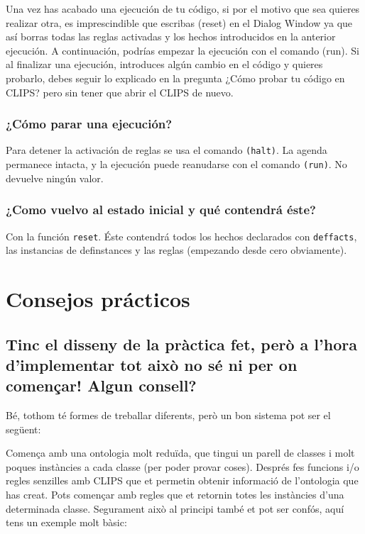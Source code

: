 \documentclass[11pt,svgnames]{scrbook}
\begin{document}
Una vez has acabado una ejecución de tu código, si por el motivo que sea quieres
realizar otra, es imprescindible que escribas (reset) en el Dialog Window ya que
así borras todas las reglas activadas y los hechos introducidos en la anterior
ejecución. A continuación, podrías empezar la ejecución con el comando (run).
Si al finalizar una ejecución, introduces algún cambio en el código y quieres
probarlo, debes seguir lo explicado en la pregunta ¿Cómo probar tu código en
CLIPS? pero sin tener que abrir el CLIPS de nuevo.

\subsection{¿Cómo parar una ejecución?}

Para detener la activación de reglas se usa el comando \texttt{(halt)}. La agenda permanece intacta, y la ejecución puede reanudarse con el comando \texttt{(run)}.
No devuelve ningún valor.

\subsection{¿Como vuelvo al estado inicial y qué contendrá éste?}

Con la función \texttt{reset}. Éste contendrá todos los hechos declarados con
\texttt{deffacts}, las instancias de definstances y las reglas (empezando desde
cero obviamente).

\chapter{Consejos prácticos}

\section{Tinc el disseny de la pràctica fet, però a l'hora d'implementar tot
això no sé
ni per on començar! Algun consell?}

Bé, tothom té formes de treballar diferents, però un bon sistema pot ser el
següent:

Comença amb una ontologia molt reduïda, que tingui un parell de classes i molt
poques instàncies a cada classe (per poder provar coses).
Després fes funcions i/o regles senzilles amb CLIPS que et permetin obtenir
informació de l'ontologia que has creat. Pots començar amb regles que et
retornin totes les instàncies d'una determinada classe. Segurament això al
principi també et pot ser confós, aquí tens un exemple molt bàsic:
\end{document}
